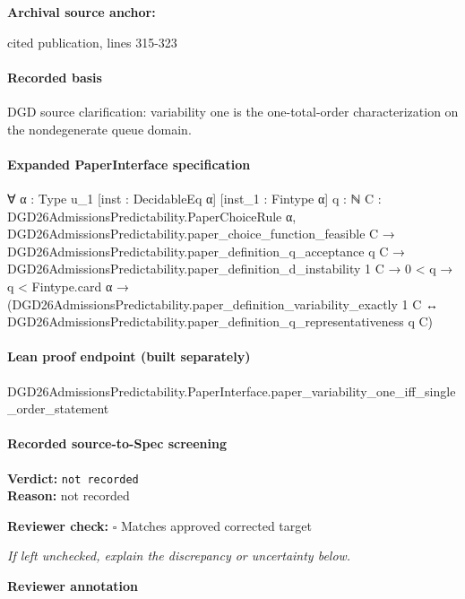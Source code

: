 \documentclass[10pt]{article}
\newcommand{\reviewerbox}{%
  \par\noindent\fbox{\parbox{0.96\linewidth}{\rule{0pt}{0.38in}}}\par
}
\newcommand{\reviewmatch}[1]{%
  \par\noindent\textbf{Reviewer check:} $\square$\; #1\par
  \noindent\emph{If left unchecked, explain the discrepancy or uncertainty below.}\par
}
\begin{document}
\textbf{Archival source anchor:} {\footnotesize\raggedright cited publication, lines 315-\allowbreak{}323\par}
\paragraph{Recorded basis}
DGD source clarification:\allowbreak{} variability one is the one-\allowbreak{}total-\allowbreak{}order characterization on the nondegenerate queue domain.\allowbreak{}
\paragraph{Expanded PaperInterface specification}
\begin{ReviewVerbatim}
∀ {α : Type u_1} [inst : DecidableEq α] [inst_1 : Fintype α] {q : ℕ}
  {C : DGD26AdmissionsPredictability.PaperChoiceRule α},
  DGD26AdmissionsPredictability.paper_choice_function_feasible C →
    DGD26AdmissionsPredictability.paper_definition_q_acceptance q C →
      DGD26AdmissionsPredictability.paper_definition_d_instability 1 C →
        0 < q →
          q < Fintype.card α →
            (DGD26AdmissionsPredictability.paper_definition_variability_exactly 1 C ↔
              DGD26AdmissionsPredictability.paper_definition_q_representativeness q C)
\end{ReviewVerbatim}

\paragraph{Lean proof endpoint (built separately)}\begin{ReviewVerbatim}
DGD26AdmissionsPredictability.PaperInterface.paper_variability_one_iff_single_order_statement
\end{ReviewVerbatim}

\paragraph{Recorded source-to-Spec screening}
\textbf{Verdict:} \texttt{not recorded}
\\
\textbf{Reason:} not recorded
\reviewmatch{Matches approved corrected target}
\noindent\textbf{Reviewer annotation}\par
\reviewerbox
\end{document}
